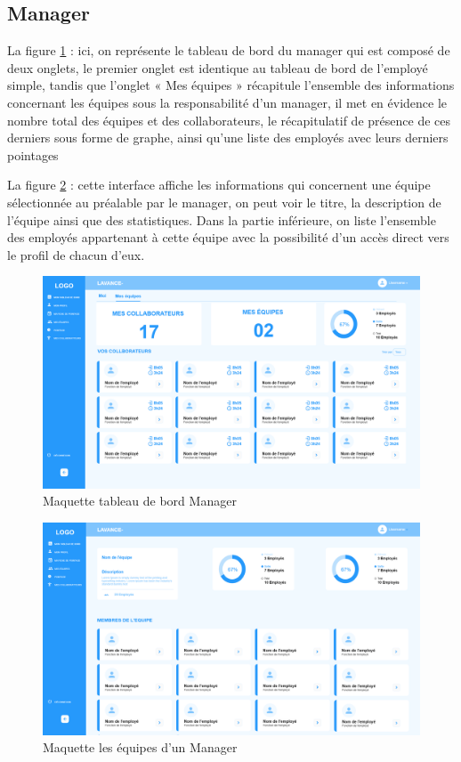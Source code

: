         \subsection{Manager}
        La figure \ref{fig8} : ici, on représente le tableau de bord du manager qui est composé de deux onglets, le premier onglet est identique au tableau de bord de l’employé simple, tandis que l’onglet « Mes équipes » récapitule l’ensemble des informations concernant les équipes sous la responsabilité d’un manager, il met en évidence le nombre total des équipes et des collaborateurs, le récapitulatif de présence de ces derniers sous forme de graphe, ainsi qu’une liste des employés avec leurs derniers pointages
        
         La figure \ref{fig9} : cette interface affiche les informations qui concernent une équipe sélectionnée au préalable par le manager, on peut voir le titre, la description de l’équipe ainsi que des statistiques. Dans la partie inférieure, on liste l’ensemble des employés appartenant à cette équipe avec la possibilité d’un accès direct vers le profil de chacun d’eux.

        
        \begin{figure}[h!]
         \centering
      \includegraphics[width=18cm]{images/dash_man_my_teams.png}
         \caption{Maquette tableau de bord Manager}
         \label{fig8}
        \end{figure}
        
     \clearpage
        
        \begin{figure}[h!]
         \centering
      \includegraphics[width=18cm]{images/my_team.png}
         \caption{Maquette les équipes d'un Manager}
         \label{fig9}
        \end{figure}

